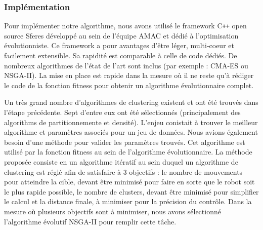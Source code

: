 \documentclass{llncs}
\newcommand*\circled[1]{\tikz[baseline=(char.base)]{
            \node[shape=circle,draw,inner sep=2pt] (char) {#1};}}
\begin{document}





\subsubsection{Implémentation}
Pour implémenter notre algorithme, nous avons utilisé le framework C{}\verb!++! open source Sferes \cite{Mouret2010} développé au sein de l'équipe AMAC et dédié à l'optimisation évolutionniste. Ce framework a pour avantages d'être léger, multi-coeur et facilement extensible. Sa rapidité est comparable à celle de code dédiés. De nombreux algorithmes de l'état de l'art sont inclus (par exemple : CMA-ES ou NSGA-II). La mise en place est rapide dans la mesure où il ne reste qu'à rédiger le code de la fonction fitness pour obtenir un algorithme évolutionnaire complet.



Un très grand nombre d'algorithmes de clustering existent et ont été trouvés dans l'étape précédente. Sept d'entre eux ont été sélectionnés (principalement des algorithms de partitionnemente et densité). L'enjeu conistait à trouver le meilleur algorithme et paramètres associés pour un jeu de données. Nous avions également besoin d'une méthode pour valider les paramètres trouvés. Cet algorithme est utilisé par la fonction fitness au sein de l'algorithme évolutionnaire. La méthode proposée consiste en un algorithme itératif au sein duquel un algorithme de clustering est réglé afin de satisfaire à 3 objectifs : \circled{1} le nombre de mouvements pour atteindre la cible, devant être minimisé pour faire en sorte que le robot soit le plus rapide possible, \circled{2} le nombre de clusters, devant être minimisé pour simplifier le calcul et \circled{3} la distance finale, à minimiser pour la précision du contrôle. Dans la mesure où plusieurs objectifs sont à minimiser, nous avons sélectionné l'algorithme évolutif NSGA-II\cite{Deb:2002:FEM:2221359.2221582} pour remplir cette tâche.
\end{document}
